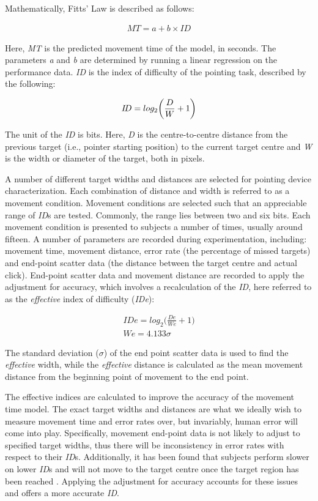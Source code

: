 \documentclass [12pt,letterpaper]{report}
\begin{document}
Mathematically, Fitts' Law is described as follows:

\begin{align}
	MT = a+b\times{}I\!D
\end{align}

Here, \textit{MT} is the predicted movement time of the model, in seconds. The parameters \textit{a} and \textit{b} are determined by running a linear regression on the performance data. \textit{ID} is the index of difficulty of the pointing task, described by the following:

\begin{align}
	I\!D = log_{2}\bigg(\frac{D}{W} + 1\bigg) \newline{}
\end{align}

The unit of the \textit{ID} is bits. Here, \textit{D} is the centre-to-centre distance from the previous target (i.e., pointer starting position) to the current target centre and \textit{W} is the width or diameter of the target, both in pixels.

A number of different target widths and distances are selected for pointing device characterization. Each combination of distance and width is referred to as a movement condition. Movement conditions are selected such that an appreciable range of \textit{ID}s are tested. Commonly, the range lies between two and six bits. Each movement condition is presented to subjects a number of times, usually around fifteen. A number of parameters are recorded during experimentation, including: movement time, movement distance, error rate (the percentage of missed targets) and end-point scatter data (the distance between the target centre and actual click). End-point scatter data and movement distance are recorded to apply the adjustment for accuracy, which involves a recalculation of the \textit{ID}, here referred to as the \textit{effective} index of difficulty (\textit{IDe}):

\begin{align}
	I\!De = log_{2}\bigg(\frac{De}{W\!e} + 1\bigg) \\
	W\!e = 4.133\sigma{}
\end{align}

The standard deviation ($\sigma$) of the end point scatter data is used to find the \textit{effective} width, while the \textit{effective} distance is calculated as the mean movement distance from the beginning point of movement to the end point.

The effective indices are calculated to improve the accuracy of the movement time model. The exact target widths and distances are what we ideally wish to measure movement time and error rates over, but invariably, human error will come into play. Specifically, movement end-point data is not likely to adjust to specified target widths, thus there will be inconsistency in error rates with respect to their \textit{ID}s. Additionally, it has been found that subjects perform slower on lower \textit{ID}s and will not move to the target centre once the target region has been reached \cite{soukoreff2004towards}. Applying the adjustment for accuracy accounts for these issues and offers a more accurate \textit{ID}.
\end{document}
